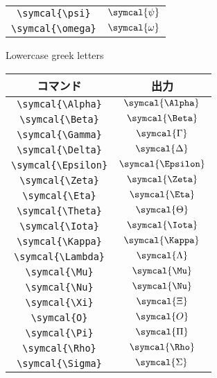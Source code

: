 \begin{table}[htbp]
\begin{subfigure}{.5\textwidth}
\begin{tabular}{cc}
            \verb|\symcal{\psi}|     & \(\symcal{\psi}\)     \\
            \verb|\symcal{\omega}|   & \(\symcal{\omega}\)   \\
            \bottomrule
        \end{tabular}
        \caption{Lowercase greek letters}
        \label{fig:lowercase_greek_cal}
    \end{subfigure}%
    \begin{subfigure}{.5\textwidth}
        \centering
        \begin{tabular}{cc}
            \toprule
            コマンド                 & 出力                  \\
            \midrule
            \verb|\symcal{\Alpha}|   & \(\symcal{\Alpha}\)   \\
            \verb|\symcal{\Beta}|    & \(\symcal{\Beta}\)    \\
            \verb|\symcal{\Gamma}|   & \(\symcal{\Gamma}\)   \\
            \verb|\symcal{\Delta}|   & \(\symcal{\Delta}\)   \\
            \verb|\symcal{\Epsilon}| & \(\symcal{\Epsilon}\) \\
            \verb|\symcal{\Zeta}|    & \(\symcal{\Zeta}\)    \\
            \verb|\symcal{\Eta}|     & \(\symcal{\Eta}\)     \\
            \verb|\symcal{\Theta}|   & \(\symcal{\Theta}\)   \\
            \verb|\symcal{\Iota}|    & \(\symcal{\Iota}\)    \\
            \verb|\symcal{\Kappa}|   & \(\symcal{\Kappa}\)   \\
            \verb|\symcal{\Lambda}|  & \(\symcal{\Lambda}\)  \\
            \verb|\symcal{\Mu}|      & \(\symcal{\Mu}\)      \\
            \verb|\symcal{\Nu}|      & \(\symcal{\Nu}\)      \\
            \verb|\symcal{\Xi}|      & \(\symcal{\Xi}\)      \\
            \verb|\symcal{O}|        & \(\symcal{O}\)        \\
            \verb|\symcal{\Pi}|      & \(\symcal{\Pi}\)      \\
            \verb|\symcal{\Rho}|     & \(\symcal{\Rho}\)     \\
            \verb|\symcal{\Sigma}|   & \(\symcal{\Sigma}\)   \\

\end{tabular}
\end{subfigure}
\end{table}
